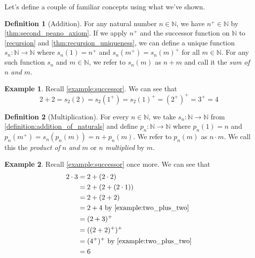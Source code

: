 \documentclass{article}
\theoremstyle{definition}
\newtheorem{definition}{Definition}[section]
\theoremstyle{definition}
\newtheorem{example}{Example}[section]
\theoremstyle{plain}
\theoremstyle{remark}
\theoremstyle{plain}
\theoremstyle{remark}
\theoremstyle{plain}
\theoremstyle{plain}
\theoremstyle{plain}
\theoremstyle{plain}
\begin{document}
Let's define a couple of familiar concepts using what we've shown.

\begin{definition}[Addition]
  For any natural number \( n \in \mathbb{N}\), we have 
  \( n^{+} \in \mathbb{N}\) by \autoref{thm:second_peano_axiom}. If we apply 
  \( n^{+} \) and the successor function on \( \mathbb{N} \) to 
  \autoref{recursion} and 
  \autoref{thm:recursion_uniqueness}, we can define a unique function 
  \( s_n : \mathbb{N} \rightarrow \mathbb{N} \) where
  \( s_n(1) = n^{+} \) and \(s_n(m^{+}) = s_n(m)^{+}\) for all 
  \( m \in \mathbb{N} \). For any such function \( s_n \) and 
  \( m \in \mathbb{N} \), we refer to \( s_n(m) \) as \( n + m \) and call it 
  the \textit{sum of} \( n \) \textit{and} \( m \). 
  \label{definition:addition_of_naturals}
\end{definition}

\begin{example}
  Recall \autoref{example:successor}. We can see that 
  \[ 2 + 2 = s_2(2) = s_2(1^{+}) = s_2(1)^{+} = (2^{+})^{+} = 3^{+} = 4 \]
  \label{example:two_plus_two}
\end{example}

\begin{definition}[Multiplication]
  For every \( n \in \mathbb{N} \), we take 
  \(s_n: \mathbb{N} \rightarrow \mathbb{N} \) from 
  \autoref{definition:addition_of_naturals} and define 
  \( p_n: \mathbb{N} \rightarrow \mathbb{N} \) where 
  \( p_n(1) = n \) and \\ \( p_n(m^{+}) = s_n(p_n(m)) = n + p_n(m) \). 
  We refer to \( p_n(m) \) as \( n \cdot m \). We call 
  this the \textit{product of} \( n \) \textit{and} \(m\) or \( n \) 
  \textit{multiplied} by \( m \). 
\end{definition}

\begin{example}
  Recall \autoref{example:successor} once more. We can see that 
  \begin{align*}
    2 \cdot 3 &= 2 + (2 \cdot 2) \\ 
              &= 2 + (2 + (2 \cdot 1)) \\ 
              &= 2 + (2 + 2) \\ 
              &= 2 + 4 \text{ by \autoref{example:two_plus_two}} \\ 
              &= (2 + 3)^{+} \\ 
              &= ((2 + 2)^{+})^{+} \\
              &= (4^{+})^{+} \text{ by \autoref{example:two_plus_two}} \\
              &= 6
  \end{align*}
\end{example}



\end{document}
